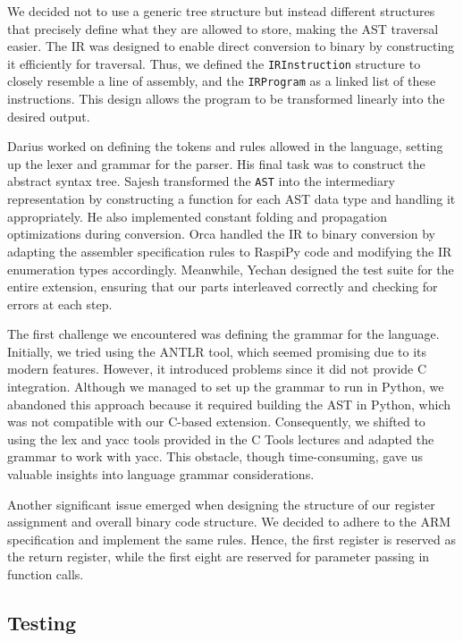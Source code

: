 \documentclass{article}
\begin{document}
We decided not to use a generic tree structure but instead different structures that precisely define what they are allowed to store, making the AST traversal easier. The IR was designed to enable direct conversion to binary by constructing it efficiently for traversal. Thus, we defined the \texttt{IRInstruction} structure to closely resemble a line of assembly, and the \texttt{IRProgram} as a linked list of these instructions. This design allows the program to be transformed linearly into the desired output.

Darius worked on defining the tokens and rules allowed in the language, setting up the lexer and grammar for the parser. His final task was to construct the abstract syntax tree. Sajesh transformed the \texttt{AST} into the intermediary representation by constructing a function for each AST data type and handling it appropriately. He also implemented constant folding and propagation optimizations during conversion. Orca handled the IR to binary conversion by adapting the assembler specification rules to RaspiPy code and modifying the IR enumeration types accordingly. Meanwhile, Yechan designed the test suite for the entire extension, ensuring that our parts interleaved correctly and checking for errors at each step.

The first challenge we encountered was defining the grammar for the language. Initially, we tried using the ANTLR tool, which seemed promising due to its modern features. However, it introduced problems since it did not provide C integration. Although we managed to set up the grammar to run in Python, we abandoned this approach because it required building the AST in Python, which was not compatible with our C-based extension. Consequently, we shifted to using the lex and yacc tools provided in the C Tools lectures and adapted the grammar to work with yacc. This obstacle, though time-consuming, gave us valuable insights into language grammar considerations.

Another significant issue emerged when designing the structure of our register assignment and overall binary code structure. We decided to adhere to the ARM specification and implement the same rules. Hence, the first register is reserved as the return register, while the first eight are reserved for parameter passing in function calls.

\subsection{Testing}
\end{document}
